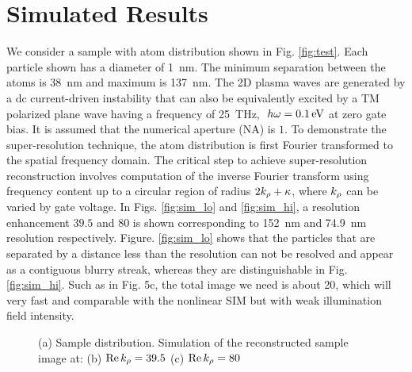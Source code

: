 \documentclass[12pt]{article}
\begin{document}
\section{Simulated Results}
%
We consider a sample with atom distribution shown in Fig. \ref{fig:test}. Each particle shown has a diameter of \SI{1}{\nm}. The minimum separation between the atoms is \SI{38}{\nm} and maximum is \SI{137}{\nm}. The 2D plasma waves are generated by a dc current-driven instability that can also be equivalently  excited by a TM polarized plane wave having a frequency of \SI{25}{\THz}, $~h\omega = \SI{.1}{\electronvolt}$ at zero gate bias. It is assumed that the numerical aperture (NA) is $1$. To demonstrate the super-resolution technique, the atom distribution is first Fourier transformed to the spatial frequency domain. The critical step to achieve super-resolution reconstruction involves computation of the inverse Fourier transform using frequency content up to a circular region of radius $2k_{\rho} + \kappa$, where $k_{\rho}$ can be varied by gate voltage. In Figs. \ref{fig:sim_lo} and \ref{fig:sim_hi}, a resolution enhancement $39.5$ and $80$ is shown corresponding to \SI{152}{\nm} and \SI{74.9}{\nm} resolution respectively.
Figure. \ref{fig:sim_lo} shows that the particles that are separated by a distance less than the resolution can not be resolved and appear as a contiguous blurry streak, whereas they are distinguishable in Fig. \ref{fig:sim_hi}.
Such as in Fig. 5c, the total image we need is about 20, which will very fast and comparable with the nonlinear SIM but with weak illumination field intensity.
%
%
\begin{figure}[t!]
   \hfil
   \hfil
  \caption{(a) Sample distribution. Simulation of the reconstructed sample image at: (b) $\Re k_{\rho} = 39.5$ (c) $\Re k_{\rho} = 80$}
  \label{fig:simulation}
\end{figure}
\end{document}
